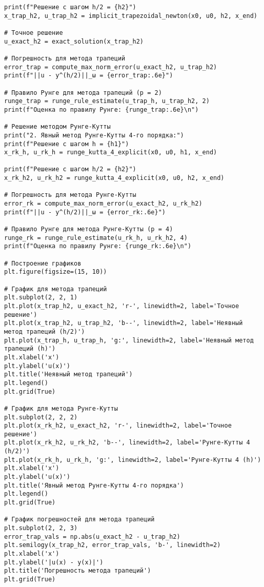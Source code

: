 \documentclass[12pt,a4paper]{article}
\begin{document}
\begin{verbatim}
print(f"Решение с шагом h/2 = {h2}")
x_trap_h2, u_trap_h2 = implicit_trapezoidal_newton(x0, u0, h2, x_end)

# Точное решение
u_exact_h2 = exact_solution(x_trap_h2)

# Погрешность для метода трапеций
error_trap = compute_max_norm_error(u_exact_h2, u_trap_h2)
print(f"||u - y^(h/2)||_ω = {error_trap:.6e}")

# Правило Рунге для метода трапеций (p = 2)
runge_trap = runge_rule_estimate(u_trap_h, u_trap_h2, 2)
print(f"Оценка по правилу Рунге: {runge_trap:.6e}\n")

# Решение методом Рунге-Кутты
print("2. Явный метод Рунге-Кутты 4-го порядка:")
print(f"Решение с шагом h = {h1}")
x_rk_h, u_rk_h = runge_kutta_4_explicit(x0, u0, h1, x_end)

print(f"Решение с шагом h/2 = {h2}")
x_rk_h2, u_rk_h2 = runge_kutta_4_explicit(x0, u0, h2, x_end)

# Погрешность для метода Рунге-Кутты
error_rk = compute_max_norm_error(u_exact_h2, u_rk_h2)
print(f"||u - y^(h/2)||_ω = {error_rk:.6e}")

# Правило Рунге для метода Рунге-Кутты (p = 4)
runge_rk = runge_rule_estimate(u_rk_h, u_rk_h2, 4)
print(f"Оценка по правилу Рунге: {runge_rk:.6e}\n")

# Построение графиков
plt.figure(figsize=(15, 10))

# График для метода трапеций
plt.subplot(2, 2, 1)
plt.plot(x_trap_h2, u_exact_h2, 'r-', linewidth=2, label='Точное решение')
plt.plot(x_trap_h2, u_trap_h2, 'b--', linewidth=2, label='Неявный метод трапеций (h/2)')
plt.plot(x_trap_h, u_trap_h, 'g:', linewidth=2, label='Неявный метод трапеций (h)')
plt.xlabel('x')
plt.ylabel('u(x)')
plt.title('Неявный метод трапеций')
plt.legend()
plt.grid(True)

# График для метода Рунге-Кутты
plt.subplot(2, 2, 2)
plt.plot(x_rk_h2, u_exact_h2, 'r-', linewidth=2, label='Точное решение')
plt.plot(x_rk_h2, u_rk_h2, 'b--', linewidth=2, label='Рунге-Кутты 4 (h/2)')
plt.plot(x_rk_h, u_rk_h, 'g:', linewidth=2, label='Рунге-Кутты 4 (h)')
plt.xlabel('x')
plt.ylabel('u(x)')
plt.title('Явный метод Рунге-Кутты 4-го порядка')
plt.legend()
plt.grid(True)

# График погрешностей для метода трапеций
plt.subplot(2, 2, 3)
error_trap_vals = np.abs(u_exact_h2 - u_trap_h2)
plt.semilogy(x_trap_h2, error_trap_vals, 'b-', linewidth=2)
plt.xlabel('x')
plt.ylabel('|u(x) - y(x)|')
plt.title('Погрешность метода трапеций')
plt.grid(True)


\end{verbatim}
\end{document}
